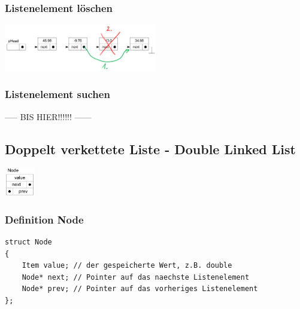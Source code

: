 \subsubsection{Listenelement löschen}
\begin{flushleft}
{\includegraphics[width=0.5\textwidth]{images/Listen/SLL_Delete.png}}
\label{Fig: Element bei SLL l"oschen}
\end{flushleft}


\subsubsection{Listenelement suchen}


----- BIS HIER!!!!!! ------

\subsection{Doppelt verkettete Liste - Double Linked List}
\begin{flushleft}
{\includegraphics[width=0.1\textwidth]{images/Listen/DLL.png}}
\label{Fig: Double Linked List}
\end{flushleft}
\subsubsection{Definition Node}
\begin{lstlisting}[style=C]
struct Node
{
	Item value; // der gespeicherte Wert, z.B. double
	Node* next; // Pointer auf das naechste Listenelement
	Node* prev; // Pointer auf das vorheriges Listenelement
};
\end{lstlisting}

